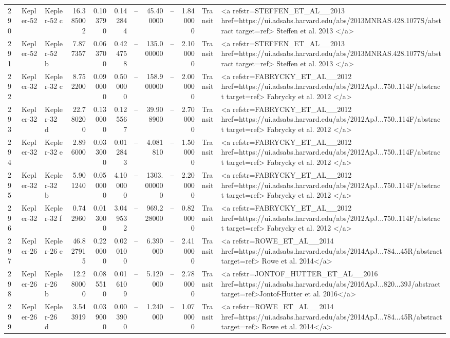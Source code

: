 \begin{tabular}{lllrrrrrrrll}
290 & Kepler-52 & Kepler-52 c & 16.385002 & 0.103790 & 0.142844 & -- & 45.400000 & -- & 1.840000 & Transit & <a refstr=STEFFEN_ET_AL__2013 href=https://ui.adsabs.harvard.edu/abs/2013MNRAS.428.1077S/abstract target=ref> Steffen et al. 2013 </a> \\
291 & Kepler-52 & Kepler-52 b & 7.877357 & 0.063700 & 0.424758 & -- & 135.000000 & -- & 2.100000 & Transit & <a refstr=STEFFEN_ET_AL__2013 href=https://ui.adsabs.harvard.edu/abs/2013MNRAS.428.1077S/abstract target=ref> Steffen et al. 2013 </a> \\
292 & Kepler-32 & Kepler-32 c & 8.752200 & 0.090000 & 0.500000 & -- & 158.900000 & -- & 2.000000 & Transit & <a refstr=FABRYCKY_ET_AL__2012 href=https://ui.adsabs.harvard.edu/abs/2012ApJ...750..114F/abstract target=ref> Fabrycky et al. 2012 </a> \\
293 & Kepler-32 & Kepler-32 d & 22.780200 & 0.130000 & 0.125567 & -- & 39.908900 & -- & 2.700000 & Transit & <a refstr=FABRYCKY_ET_AL__2012 href=https://ui.adsabs.harvard.edu/abs/2012ApJ...750..114F/abstract target=ref> Fabrycky et al. 2012 </a> \\
294 & Kepler-32 & Kepler-32 e & 2.896000 & 0.033000 & 0.012843 & -- & 4.081810 & -- & 1.500000 & Transit & <a refstr=FABRYCKY_ET_AL__2012 href=https://ui.adsabs.harvard.edu/abs/2012ApJ...750..114F/abstract target=ref> Fabrycky et al. 2012 </a> \\
295 & Kepler-32 & Kepler-32 b & 5.901240 & 0.050000 & 4.100000 & -- & 1303.000000 & -- & 2.200000 & Transit & <a refstr=FABRYCKY_ET_AL__2012 href=https://ui.adsabs.harvard.edu/abs/2012ApJ...750..114F/abstract target=ref> Fabrycky et al. 2012 </a> \\
296 & Kepler-32 & Kepler-32 f & 0.742960 & 0.013000 & 3.049532 & -- & 969.228000 & -- & 0.820000 & Transit & <a refstr=FABRYCKY_ET_AL__2012 href=https://ui.adsabs.harvard.edu/abs/2012ApJ...750..114F/abstract target=ref> Fabrycky et al. 2012 </a> \\
297 & Kepler-26 & Kepler-26 e & 46.827915 & 0.220000 & 0.020100 & -- & 6.390000 & -- & 2.410000 & Transit & <a refstr=ROWE_ET_AL__2014 href=https://ui.adsabs.harvard.edu/abs/2014ApJ...784...45R/abstract target=ref> Rowe et al. 2014</a> \\
298 & Kepler-26 & Kepler-26 b & 12.280000 & 0.085510 & 0.016109 & -- & 5.120000 & -- & 2.780000 & Transit & <a refstr=JONTOF_HUTTER_ET_AL__2016 href=https://ui.adsabs.harvard.edu/abs/2016ApJ...820...39J/abstract target=ref>Jontof-Hutter et al. 2016</a> \\
299 & Kepler-26 & Kepler-26 d & 3.543919 & 0.039000 & 0.003900 & -- & 1.240000 & -- & 1.070000 & Transit & <a refstr=ROWE_ET_AL__2014 href=https://ui.adsabs.harvard.edu/abs/2014ApJ...784...45R/abstract target=ref> Rowe et al. 2014</a> \\

\end{tabular}

